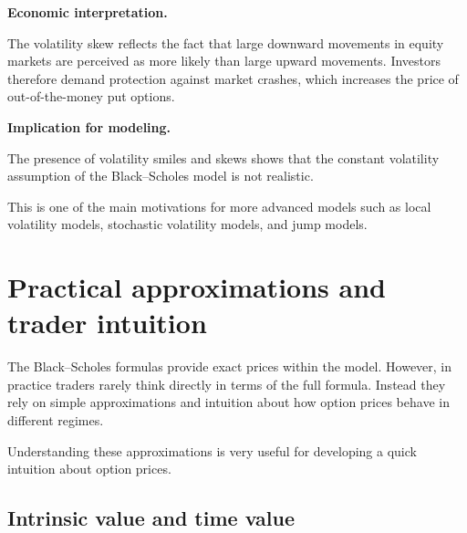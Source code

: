 \documentclass[11pt]{article}
\newcommand{\1}{\mathbf{1}}
\theoremstyle{plain}
\theoremstyle{definition}
\theoremstyle{remark}
\begin{document}
\begin{center}
\end{center}

\medskip

\textbf{Economic interpretation.}

The volatility skew reflects the fact that large downward movements in
equity markets are perceived as more likely than large upward movements.
Investors therefore demand protection against market crashes,
which increases the price of out-of-the-money put options.

\medskip

\textbf{Implication for modeling.}

The presence of volatility smiles and skews shows that the constant
volatility assumption of the Black--Scholes model is not realistic.

This is one of the main motivations for more advanced models such as
local volatility models, stochastic volatility models, and jump models.

\section{Practical approximations and trader intuition}

The Black--Scholes formulas provide exact prices within the model.
However, in practice traders rarely think directly in terms of the full
formula. Instead they rely on simple approximations and intuition about
how option prices behave in different regimes.

Understanding these approximations is very useful for developing a quick
intuition about option prices.

\subsection{Intrinsic value and time value}
\end{document}

